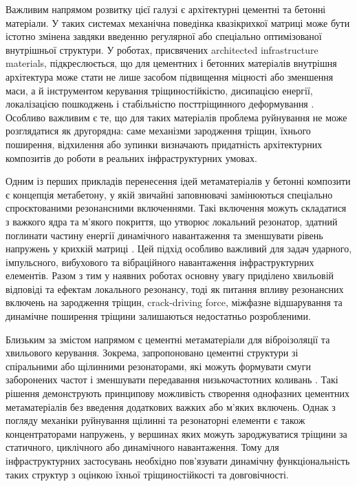 \documentclass[12pt,a4paper]{article}
\begin{document}
Важливим напрямом розвитку цієї галузі є архітектурні цементні та бетонні матеріали. У таких системах механічна поведінка квазікрихкої матриці може бути істотно змінена завдяки введенню регулярної або спеціально оптимізованої внутрішньої структури. У роботах, присвячених architected infrastructure materials, підкреслюється, що для цементних і бетонних матеріалів внутрішня архітектура може стати не лише засобом підвищення міцності або зменшення маси, а й інструментом керування тріщиностійкістю, дисипацією енергії, локалізацією пошкоджень і стабільністю посттріщинного деформування \cite{Moini2024}. Особливо важливим є те, що для таких матеріалів проблема руйнування не може розглядатися як другорядна: саме механізми зародження тріщин, їхнього поширення, відхилення або зупинки визначають придатність архітектурних композитів до роботи в реальних інфраструктурних умовах.

Одним із перших прикладів перенесення ідей метаматеріалів у бетонні композити є концепція метабетону, у якій звичайні заповнювачі замінюються спеціально спроєктованими резонансними включеннями. Такі включення можуть складатися з важкого ядра та м'якого покриття, що утворює локальний резонатор, здатний поглинати частину енергії динамічного навантаження та зменшувати рівень напружень у крихкій матриці \cite{Mitchell2014}. Цей підхід особливо важливий для задач ударного, імпульсного, вибухового та вібраційного навантаження інфраструктурних елементів. Разом з тим у наявних роботах основну увагу приділено хвильовій відповіді та ефектам локального резонансу, тоді як питання впливу резонансних включень на зародження тріщин, crack-driving force, міжфазне відшарування та динамічне поширення тріщини залишаються недостатньо розробленими.

Близьким за змістом напрямом є цементні метаматеріали для віброізоляції та хвильового керування. Зокрема, запропоновано цементні структури зі спіральними або щілинними резонаторами, які можуть формувати смуги заборонених частот і зменшувати передавання низькочастотних коливань \cite{Imagawa2025}. Такі рішення демонструють принципову можливість створення однофазних цементних метаматеріалів без введення додаткових важких або м'яких включень. Однак з погляду механіки руйнування щілинні та резонаторні елементи є також концентраторами напружень, у вершинах яких можуть зароджуватися тріщини за статичного, циклічного або динамічного навантаження. Тому для інфраструктурних застосувань необхідно пов'язувати динамічну функціональність таких структур з оцінкою їхньої тріщиностійкості та довговічності.
\end{document}
